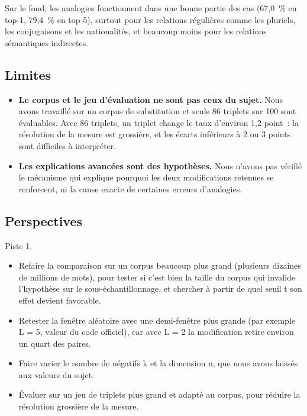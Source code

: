 \documentclass[11pt,a4paper]{article}
\begin{document}
Sur le fond, les analogies fonctionnent dans une bonne partie des cas (67,0~\% en top-1, 79,4~\% en top-5), surtout pour les relations régulières comme les pluriels, les conjugaisons et les nationalités, et beaucoup moins pour les relations sémantiques indirectes.

\subsection{Limites}

\begin{itemize}

\item \textbf{Le corpus et le jeu d’évaluation ne sont pas ceux du sujet.} Nous avons travaillé sur un corpus de substitution et seuls 86 triplets sur 100 sont évaluables. Avec 86 triplets, un triplet change le taux d’environ 1,2 point~: la résolution de la mesure est grossière, et les écarts inférieurs à 2 ou 3 points sont difficiles à interpréter.

\item \textbf{Les explications avancées sont des hypothèses.} Nous n’avons pas vérifié le mécanisme qui explique pourquoi les deux modifications retenues se renforcent, ni la cause exacte de certaines erreurs d’analogies.

\end{itemize}

\subsection{Perspectives}

Piste 1.

\begin{itemize}

\item Refaire la comparaison sur un corpus beaucoup plus grand (plusieurs dizaines de millions de mots), pour tester si c’est bien la taille du corpus qui invalide l’hypothèse sur le sous-échantillonnage, et chercher à partir de quel seuil t son effet devient favorable.

\item Retester la fenêtre aléatoire avec une demi-fenêtre plus grande (par exemple L = 5, valeur du code officiel), car avec L = 2 la modification retire environ un quart des paires.

\item Faire varier le nombre de négatifs k et la dimension n, que nous avons laissés aux valeurs du sujet.

\item Évaluer sur un jeu de triplets plus grand et adapté au corpus, pour réduire la résolution grossière de la mesure.

\end{itemize}
\end{document}

